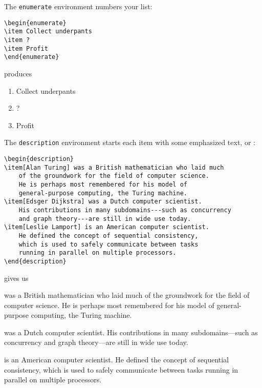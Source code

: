 \bigskip
\noindent The \texttt{enumerate} environment numbers your list:
\begin{leftfigure}
\begin{lstlisting}
\begin{enumerate}
\item Collect underpants
\item ?
\item Profit
\end{enumerate}
\end{lstlisting}
\end{leftfigure}
produces
\begin{leftfigure}
\lm%
\begin{enumerate}[leftmargin=*]
\item Collect underpants
\item ?
\item Profit
\end{enumerate}
\end{leftfigure}

\bigskip
\noindent The \texttt{description} environment starts each item with some
emphasized text, or :
\begin{leftfigure}
\begin{lstlisting}
\begin{description}
\item[Alan Turing] was a British mathematician who laid much
    of the groundwork for the field of computer science.
    He is perhaps most remembered for his model of
    general-purpose computing, the Turing machine.
\item[Edsger Dijkstra] was a Dutch computer scientist.
    His contributions in many subdomains---such as concurrency
    and graph theory---are still in wide use today.
\item[Leslie Lamport] is an American computer scientist.
    He defined the concept of sequential consistency,
    which is used to safely communicate between tasks
    running in parallel on multiple processors.
\end{description}
\end{lstlisting}
\end{leftfigure}
gives us
\begin{leftfigure}
\begin{minipage}{0.8\textwidth}
\lm%
\begin{description}[leftmargin=*]
\item[Alan Turing] was a British mathematician who laid much
    of the groundwork for the field of computer science.
    He is perhaps most remembered for his model of
    general-purpose computing, the Turing machine.
\item[Edsger Dijkstra] was a Dutch computer scientist.
    His contributions in many subdomains---such as concurrency
    and graph theory---are still in wide use today.
\item[Leslie Lamport] is an American computer scientist.
    He defined the concept of sequential consistency,
    which is used to safely communicate between tasks
    running in parallel on multiple processors.
\end{description}
\end{minipage}
\end{leftfigure}

